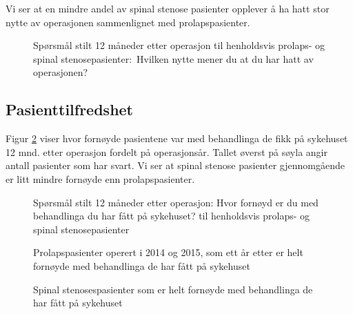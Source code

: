 \documentclass [norsk,a4paper,twoside]{article}\usepackage[]{graphicx}\usepackage[]{color}
\begin{document}
Vi ser at en mindre andel av spinal stenose pasienter opplever å ha hatt stor nytte av operasjonen sammenlignet 
med prolapspasienter.



\begin{figure}[h] 
\begin{center}
\end{center}
\caption{Spørsmål stilt 12 måneder etter operasjon til henholdsvis prolaps- og spinal stenosepasienter$:$ Hvilken nytte mener du at du har hatt av operasjonen?}
\label{fig:Nytte}
\end{figure}

\subsection{Pasienttilfredshet}

Figur \ref{fig:Fornoyd} viser hvor fornøyde pasientene var med behandlinga de fikk på sykehuset 12 mnd. 
etter operasjon fordelt på operasjonsår. Tallet øverst på søyla angir antall pasienter som har svart. Vi ser at spinal stenose pasienter gjennomgående er litt mindre fornøyde enn prolapspasienter.




\begin{figure}[h] 
\begin{center}
\end{center}
\caption{Spørsmål stilt 12 måneder etter operasjon: Hvor fornøyd er du med behandlinga du har fått på sykehuset? til henholdsvis prolaps- og spinal stenosepasienter}
\label{fig:Fornoyd}
\end{figure}

\begin{figure}[h] 
\caption{Prolapspasienter operert i 2014 og 2015, som ett år etter er helt fornøyde med behandlinga de har fått på sykehuset}
\label{fig:FornoydAvdPro}
\end{figure}

\begin{figure}[h] 
\caption{Spinal stenosespasienter som er helt fornøyde med behandlinga de har fått på sykehuset}
\label{fig:FornoydAvdSS}
\end{figure}
\end{document}
